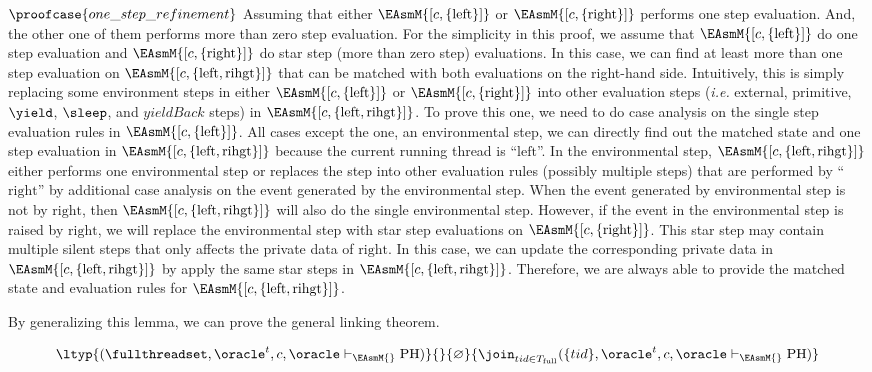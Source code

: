 $\proofcase{one\_step\_refinement}$
Assuming that either $\EAsmM{[c, \mathrm{\{left\}}]}$ or  $\EAsmM{[c, \mathrm{\{right\}}]}$  performs one step
evaluation. 
And, the other one of them performs more than zero step evaluation. 
For the simplicity in this proof, we assume that $\EAsmM{[c, \mathrm{\{left\}}]}$ do one step evaluation and $\EAsmM{[c, \mathrm{\{right\}}]}$ do  star step (more than zero step) evaluations.
In this case, we can find at least more than one step evaluation on $\EAsmM{[c, \mathrm{\{left, rihgt\}}]}$
that can be matched with both evaluations on the right-hand side. 
Intuitively, this is simply replacing some environment steps in either $\EAsmM{[c, \mathrm{\{left\}}]}$ or $\EAsmM{[c, \mathrm{\{right\}}]}$ into other evaluation steps 
(\textit{i.e.} external, primitive, $\yield$, $\sleep$, and $yieldBack$ steps) in $\EAsmM{[c, \mathrm{\{left, rihgt\}}]}$.
To prove this one, we need to do case analysis on the single step evaluation rules in $\EAsmM{[c, \mathrm{\{left\}}]}$.
All cases except the one, an environmental step, we can directly find out the matched state and one step evaluation in
$\EAsmM{[c, \mathrm{\{left, rihgt\}}]}$ because the current running thread is ``$\mathrm{left}$''. 
In the environmental step, $\EAsmM{[c, \mathrm{\{left, rihgt\}}]}$ either performs one environmental step or 
replaces the step into other evaluation rules (possibly multiple steps) that are performed by ``$\mathrm{right}$'' 
by additional case analysis on the event generated by the environmental step.
When the event generated by environmental step is not by $\mathrm{right}$, 
then $\EAsmM{[c, \mathrm{\{left, rihgt\}}]}$ will also do the single environmental step. 
However, if the event in the environmental step is raised by $\mathrm{right}$, we will replace the environmental step 
with star step evaluations on $\EAsmM{[c, \mathrm{\{right\}}]}$.
This star step may contain multiple silent steps that only affects the private data of $\mathrm{right}$.
In this case, we can update the corresponding private data in $\EAsmM{[c, \mathrm{\{left, rihgt\}}]}$ by apply the 
same star steps in $\EAsmM{[c, \mathrm{\{left, rihgt\}}]}$.
Therefore, we are always able to provide the matched state and evaluation rules for $\EAsmM{[c, \mathrm{\{left, rihgt\}}]}$.

By generalizing this lemma, we can prove the general linking theorem. 
\begin{theorem}
\begin{small}
$$\ltyp{(\fullthreadset, \oracle^t, c, \oracle  \vdash_{\EAsmM{}} \mathrm{PH})}{}
{\varnothing}{\join_{tid \in T_{\mathrm{full}}} ( \{tid\}, \oracle^t, c, \oracle\vdash_{\EAsmM{}} \mathrm{PH})}$$
\end{small}
\label{theorem:thread-full-compose}
\end{theorem}

